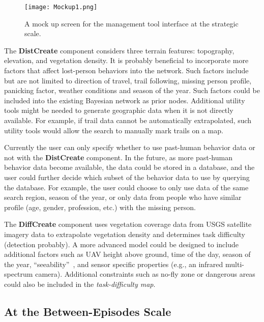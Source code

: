\begin{figure}
\centering
\texttt{[image: Mockup1.png]}
\caption{A mock up screen for the management tool interface at the strategic scale.}
\label{Mockup1}
\end{figure}

The \textbf{DistCreate} component considers three terrain features: topography, elevation, and vegetation density. It is probably beneficial to incorporate more factors that affect lost-person behaviors into the network. Such factors include but are not limited to direction of travel, trail following, missing person profile, panicking factor, weather conditions and season of the year. Such factors could be included into the existing Bayesian network as prior nodes. Additional utility tools might be needed to generate geographic data when it is not directly available. For example, if trail data cannot be automatically extrapolated, such utility tools would allow the search to manually mark trails on a map.

Currently the user can only specify whether to use past-human behavior data or not with the \textbf{DistCreate} component. In the future, as more past-human behavior data become available, the data could be stored in a database, and the user could further decide which subset of the behavior data to use by querying the database. For example, the user could choose to only use data of the same search region, season of the year, or only data from people who have similar profile (age, gender, profession, etc.) with the missing person.

The \textbf{DiffCreate} component uses vegetation coverage data from USGS satellite imagery data to extrapolate vegetation density and determines task difficulty (detection probably). A more advanced model could be designed to include additional factors such as UAV height above ground, time of the day, season of the year, ``seeability''~\cite{Morse2010UAV}, and sensor specific properties (e.g., an infrared multi-spectrum camera). Additional constraints such as no-fly zone or dangerous areas could also be included in the \textit{task-difficulty map}.

\subsection{At the Between-Episodes Scale}

